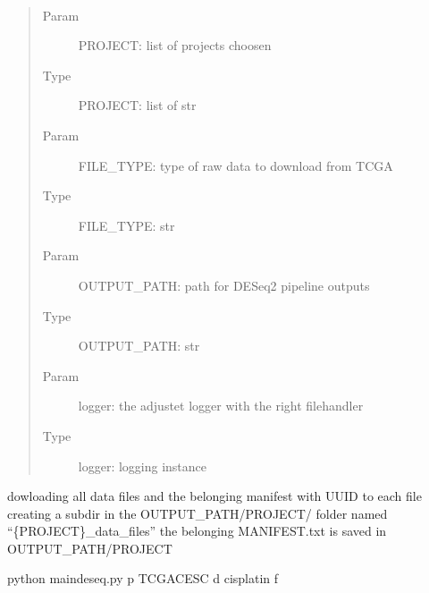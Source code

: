 \documentclass[letterpaper,10pt,english]{sphinxmanual}
\begin{document}
\begin{fulllineitems}
\label{\detokenize{index:create_matrix_new.download_data_files}}~\begin{quote}\begin{description}
\item[{Param}] \leavevmode
\sphinxAtStartPar
PROJECT: list of projects choosen

\item[{Type}] \leavevmode
\sphinxAtStartPar
PROJECT: list of str

\item[{Param}] \leavevmode
\sphinxAtStartPar
FILE\_TYPE: type of raw data to download from TCGA

\item[{Type}] \leavevmode
\sphinxAtStartPar
FILE\_TYPE: str

\item[{Param}] \leavevmode
\sphinxAtStartPar
OUTPUT\_PATH: path for DESeq2 pipeline outputs

\item[{Type}] \leavevmode
\sphinxAtStartPar
OUTPUT\_PATH: str

\item[{Param}] \leavevmode
\sphinxAtStartPar
logger: the adjustet logger with the right filehandler

\item[{Type}] \leavevmode
\sphinxAtStartPar
logger: logging instance

\end{description}\end{quote}

\sphinxAtStartPar
dowloading all data files and the belonging manifest with UUID to each file
creating a subdir in the OUTPUT\_PATH/PROJECT/ folder named
“\{PROJECT\}\_data\_files”
the belonging MANIFEST.txt is saved in OUTPUT\_PATH/PROJECT

\begin{sphinxVerbatim}[commandchars=\\\{\}]
\PYGZdl{} python main\PYGZus{}deseq.py \PYGZhy{}p TCGA\PYGZhy{}CESC \PYGZhy{}d cisplatin \PYGZhy{}f 
\end{sphinxVerbatim}

\end{fulllineitems}
\end{document}
